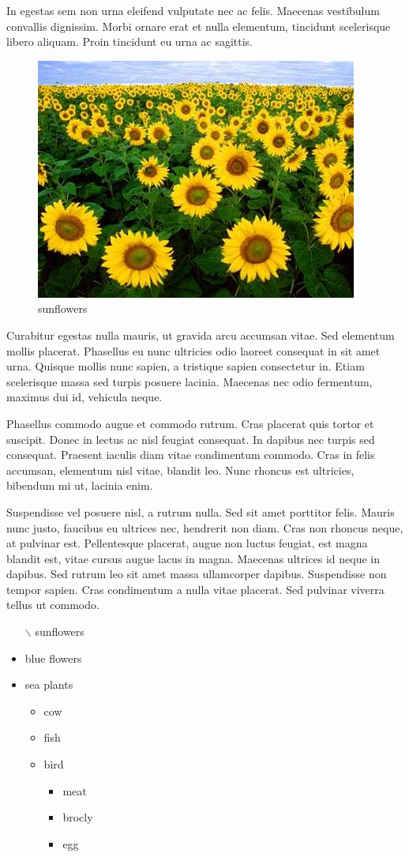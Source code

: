 \documentclass[a4paper, 12pt]{article}
\begin{document}
	In egestas sem non urna eleifend vulputate nec ac felis. Maecenas vestibulum convallis dignissim. Morbi ornare erat et nulla elementum, tincidunt scelerisque libero aliquam. Proin tincidunt eu urna ac sagittis.
	\begin{figure}
		\includegraphics[scale=.5]{images/f4.jpg}
		\caption{sunflowers}
	\end{figure} 
	Curabitur egestas nulla mauris, ut gravida arcu accumsan vitae. Sed elementum mollis placerat. Phasellus eu nunc ultricies odio laoreet consequat in sit amet urna. Quisque mollis nunc sapien, a tristique sapien consectetur in. Etiam scelerisque massa sed turpis posuere lacinia. Maecenas nec odio fermentum, maximus dui id, vehicula neque.
	
	Phasellus commodo augue et commodo rutrum. Cras placerat quis tortor et suscipit. Donec in lectus ac nisl feugiat consequat. In dapibus nec turpis sed consequat. Praesent iaculis diam vitae condimentum commodo. Cras in felis accumsan, elementum nisl vitae, blandit leo. Nunc rhoncus est ultricies, bibendum mi ut, lacinia enim.
	
	Suspendisse vel posuere nisl, a rutrum nulla. Sed sit amet porttitor felis. Mauris nunc justo, faucibus eu ultrices nec, hendrerit non diam. Cras non rhoncus neque, at pulvinar est. Pellentesque placerat, augue non luctus feugiat, est magna blandit est, vitae cursus augue lacus in magna. Maecenas ultrices id neque in dapibus. Sed rutrum leo sit amet massa ullamcorper dapibus. Suspendisse non tempor sapien. Cras condimentum a nulla vitae placerat. Sed pulvinar viverra tellus ut commodo.
	\begin{itemize}
		\item[$\backslash$] sunflowers
		\item blue flowers
		\item sea plants
		\begin{itemize}
			\item cow
			\item fish
			\item bird
			\begin{itemize}
				\item meat
				\item brocly
				\item egg
			\end{itemize}
		\end{itemize}
	\end{itemize}
\end{document}
